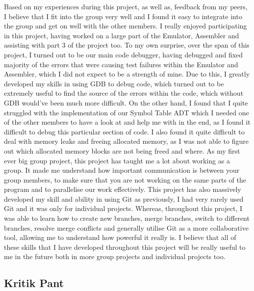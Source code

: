 \documentclass[11pt]{article}
\begin{document}
Based on my experiences during this project, as well as, feedback from my peers, I believe that I fit into the group very well and I found it easy to integrate into 
the group and get on well with the other members. I really enjoyed participating in this project, having worked on a large part of the Emulator, Assembler and assisting with part 3 
of the project too. To my own surprise, over the span of this project, I turned out to be our main code debugger, having debugged and fixed majority of the errors that were causing test failures 
within the Emulator and Assembler, which I did not expect to be a strength of mine. Due to this, I greatly developed my skills in using GDB to debug code, which turned out to be 
extremely useful to find the source of the errors within the code, which without GDB would've been much more difficult. On the other hand, I found that I quite struggled with 
the implementation of our Symbol Table ADT which I needed one of the other members to have a look at and help me with in the end, as I found it difficult to debug this particular 
section of code. I also found it quite difficult to deal with memory leaks and freeing allocated memory, as I was not able to figure out which allocated memory blocks are not being freed and where.
\newline
As my first ever big group project, this project has taught me a lot about working as a group. It made me understand how important communication is between your group members, to make sure 
that you are not working on the same parts of the program and to parallelise our work effectively. This project has also massively developed my skill and ability in using Git as previously, I had 
very rarely used Git and it was only for individual projects. Whereas, throughout this project, I was able to learn how to create new branches, merge branches, switch to different branches, resolve merge 
conflicts and generally utilise Git as a more collaborative tool, allowing me to understand how powerful it really is. I believe that all of these skills that I have developed throughout this project 
will be really useful to me in the future both in more group projects and individual projects too.

\subsection{Kritik Pant}
\end{document}
